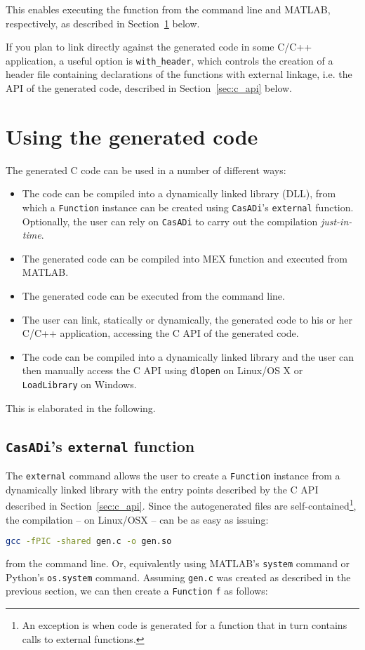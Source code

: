 \documentclass[a4paper,12pt]{book}
\newcommand{\CasADi}{\texttt{CasADi}\xspace}
\begin{document}
This enables executing the function from the command line and MATLAB, respectively,
as described in Section~\ref{sec:using_codegen} below.

If you plan to link directly against the generated code in some C/C++ application,
a useful option is \verb|with_header|, which controls the creation of a header file
containing declarations of the functions with external linkage, i.e. the API of
the generated code, described in Section~\ref{sec:c_api} below.

\section{Using the generated code} \label{sec:using_codegen}
The generated C code can be used in a number of different ways:
\begin{itemize}
  \item The code can be compiled into a dynamically linked library (DLL),
  from which a \texttt{Function} instance can be created using \CasADi's
  \texttt{external} function. Optionally, the user can rely on \CasADi to
  carry out the compilation \emph{just-in-time}.
  \item The generated code can be compiled into MEX function and executed from MATLAB.
  \item The generated code can be executed from the command line.
  \item The user can link, statically or dynamically, the generated code to his
  or her C/C++ application, accessing the C API of the generated code.
  \item The code can be compiled into a dynamically linked library and the user can then
  manually access the C API using \texttt{dlopen} on Linux/OS X or \texttt{LoadLibrary}
  on Windows.
\end{itemize}

This is elaborated in the following.

\subsection*{\CasADi's \texttt{external} function}
The \texttt{external} command allows the user to create a \texttt{Function} instance
from a dynamically linked library with the entry points described by the
C API described in Section~\ref{sec:c_api}. Since the autogenerated files are
self-contained\footnote{An exception is when code is generated for a function
that in turn contains calls to external functions.}, the compilation
-- on Linux/OSX -- can be as easy as issuing:
\begin{lstlisting}[language=sh]
gcc -fPIC -shared gen.c -o gen.so
\end{lstlisting}
from the command line. Or, equivalently using MATLAB's \texttt{system} command
or Python's \texttt{os.system} command. Assuming \verb|gen.c| was created as
described in the previous section, we can then create a \texttt{Function}
\texttt{f} as follows:
\end{document}
